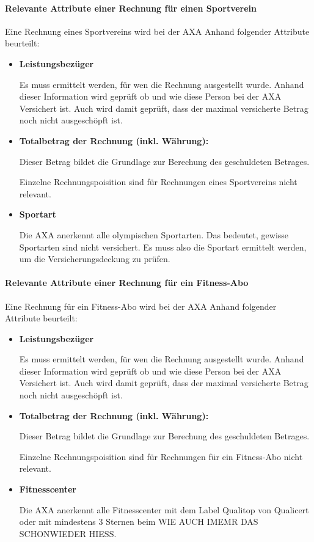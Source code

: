 \paragraph{
    \textbf{Relevante Attribute einer Rechnung für einen Sportverein}
}

Eine Rechnung eines Sportvereins wird bei der AXA Anhand folgender Attribute beurteilt:

\begin{itemize}
    \item \textbf{Leistungsbezüger}
    
    Es muss ermittelt werden, für wen die Rechnung ausgestellt wurde. Anhand dieser Information wird geprüft ob und wie diese Person bei der AXA Versichert ist. Auch wird damit geprüft, dass der maximal versicherte Betrag noch nicht ausgeschöpft ist.
    \item \textbf{Totalbetrag der Rechnung (inkl. Währung):}
    
    Dieser Betrag bildet die Grundlage zur Berechung des geschuldeten Betrages. 
    
    Einzelne Rechnungspoisition sind für Rechnungen eines Sportvereins nicht relevant.
    \item \textbf{Sportart}
    
    Die AXA anerkennt alle olympischen Sportarten. Das bedeutet, gewisse Sportarten sind nicht versichert. Es muss also die Sportart ermittelt werden, um die Versicherungsdeckung zu prüfen.
\end{itemize}

\paragraph{
    \textbf{Relevante Attribute einer Rechnung für ein Fitness-Abo}
}

Eine Rechnung für ein Fitness-Abo wird bei der AXA Anhand folgender Attribute beurteilt:

\begin{itemize}
    \item \textbf{Leistungsbezüger}
    
    Es muss ermittelt werden, für wen die Rechnung ausgestellt wurde. Anhand dieser Information wird geprüft ob und wie diese Person bei der AXA Versichert ist. Auch wird damit geprüft, dass der maximal versicherte Betrag noch nicht ausgeschöpft ist.
    \item \textbf{Totalbetrag der Rechnung (inkl. Währung):}
    
    Dieser Betrag bildet die Grundlage zur Berechung des geschuldeten Betrages. 
    
    Einzelne Rechnungspoisition sind für Rechnungen für ein Fitness-Abo nicht relevant.
    \item \textbf{Fitnesscenter}
    
    Die AXA anerkennt alle Fitnesscenter mit dem Label Qualitop von Qualicert oder mit mindestens 3 Sternen beim WIE AUCH IMEMR DAS SCHONWIEDER HIESS.
\end{itemize}

